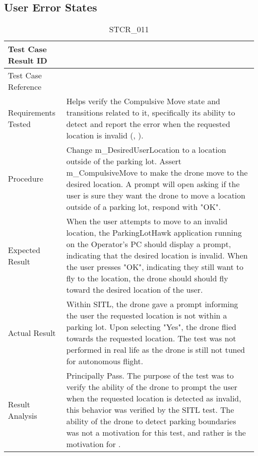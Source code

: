 \documentclass[12pt, titlepage]{article}
\begin{document}
\clearpage

\subsection{User Error States}

\begin{table}[!h]
\begin{center}
\caption {STCR\_011}
\label{tab:STCR_011}
\begin{tabular}{ | m{3.2cm} | m{12.2cm} | } 
\hline
Test Case Result ID & \nameref{tab:STCR_011} \\ 
\hline
Test Case Reference & \nameref{tab:STC_011}  \\ 
\hline
Requirements Tested & Helps verify the Compulsive Move state and transitions related to it, specifically its ability to detect and report the error when the requested location is invalid (\nameref{STA_013}, \nameref{TRANS_005}). \\ 
\hline
Procedure & Change m\_DesiredUserLocation to a location outside of the parking lot. Assert m\_CompulsiveMove to make the drone move to the desired location. A prompt will open asking if the user is sure they want the drone to move a location outside of a parking lot, respond with "OK". \\
\hline
Expected Result & When the user attempts to move to an invalid location, the ParkingLotHawk application running on the Operator's PC should display a prompt, indicating that the desired location is invalid. When the user presses "OK", indicating they still want to fly to the location, the drone should should fly toward the desired location of the user.  \\ 
\hline
Actual Result & Within SITL, the drone gave a prompt informing the user the requested location is not within a parking lot. Upon selecting "Yes", the drone flied towards the requested location. The test was not performed in real life as the drone is still not tuned for autonomous flight.  \\
\hline
Result Analysis & Principally Pass. The purpose of the test was to verify the ability of the drone to prompt the user when the requested location is detected as invalid, this behavior was verified by the SITL test. The ability of the drone to detect parking boundaries was not a motivation for this test, and rather is the motivation for \nameref{tab:STC_014}.  \\ 
\hline
\end{tabular}
\end{center}
\end{table}
\end{document}
